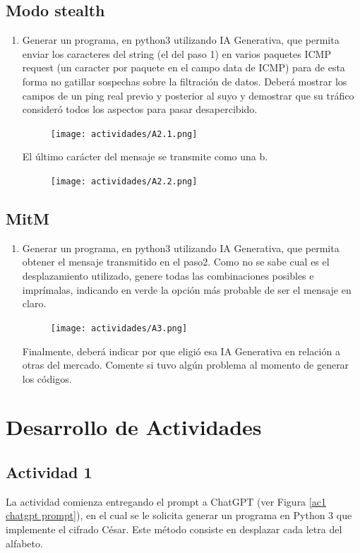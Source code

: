 \documentclass[letter,12pt]{article}
\begin{document}
\subsection{Modo stealth}
\label{actividad 2}
\begin{enumerate}
    \item Generar un programa, en python3 utilizando IA Generativa, que permita enviar los caracteres del string (el del paso 1) en varios paquetes ICMP request (un caracter por paquete en el campo data de ICMP) para de esta forma no gatillar sospechas sobre la filtración de datos.
Deberá mostrar los campos de un ping real previo y posterior al suyo y demostrar que su tráfico consideró todos los aspectos para pasar desapercibido.
    \begin{figure}[H]
        \centering
        \texttt{[image: actividades/A2.1.png]}
        \label{fig:a2-1}
    \end{figure}
    El último carácter del mensaje se transmite como una b.
    \begin{figure}[H]
            \centering
            \texttt{[image: actividades/A2.2.png]}
            \label{fig:a2-2}
        \end{figure}
\end{enumerate}

\subsection{MitM}
\label{actividad 3}
\begin{enumerate}
    \item Generar un programa, en python3 utilizando IA Generativa, que permita obtener el mensaje transmitido en el paso2. Como no se sabe cual es el desplazamiento utilizado, genere todas las combinaciones posibles e imprímalas, indicando en verde la opción más probable de ser el mensaje en claro.
    \begin{figure}[H]
        \centering
        \texttt{[image: actividades/A3.png]}
        \label{fig:a3}
    \end{figure}
    Finalmente, deberá indicar por que eligió esa IA Generativa en relación a otras del mercado. Comente si tuvo algún problema al momento de generar los códigos.
\end{enumerate}

\section{Desarrollo de Actividades}
\subsection{Actividad 1}
\label{actividad 1 respuesta}
La actividad comienza entregando el prompt a ChatGPT (ver Figura \ref{ac1 chatgpt prompt}), en el cual se le solicita generar un programa en Python 3 que implemente el cifrado César. Este método consiste en desplazar cada letra del alfabeto.
\end{document}
